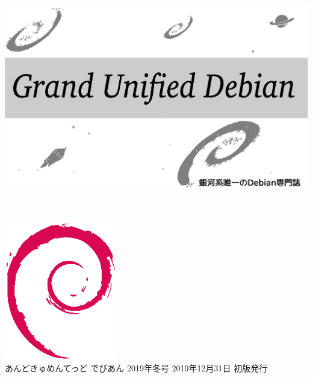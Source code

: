\documentclass[mingoth,a4paper]{jsarticle}
\begin{document}
\begin{titlepage}
\thispagestyle{empty}

\hspace*{-2.5cm}
\includegraphics{image2012-natsu/gudeb.eps}\\
\\
\\

\hspace*{11cm}\includegraphics[height=6cm]{image200502/openlogo-nd.eps}\\
\vspace*{0.1cm}
\hfill あんどきゅめんてっど でびあん 2019年冬号 2019年12月31日 初版発行
\end{titlepage}

\newpage
\thispagestyle{empty}\mbox{}
\newpage
\end{document}
